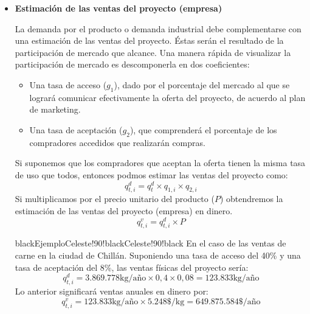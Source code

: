 \documentclass{templateNote}
\newcommand{\newparagraph}{\par\vspace{\baselineskip}\noindent}
\begin{document}
\begin{itemize}
  \item \textbf{Estimación de las ventas del proyecto (empresa)}
  \newparagraph
  La demanda por el producto o demanda industrial debe complementarse con una estimación de las ventas del proyecto. Éstas serán el resultado de la participación de mercado que alcance. Una manera rápida de visualizar la participación de mercado es descomponerla en dos coeficientes:
  \begin{itemize}
    \item Una tasa de acceso ($g_1$), dado por el porcentaje del mercado al que se logrará comunicar efectivamente la oferta del proyecto, de acuerdo al plan de marketing.
    \item Una tasa de aceptación ($g_2$), que comprenderá el porcentaje de los compradores accedidos que realizarán compras.
  \end{itemize}
  Si suponemos que los compradores que aceptan la oferta tienen la misma tasa de uso que todos, entonces podmos estimar las ventas del proyecto como:
  \begin{equation*}
    q_{t,i}^d = q_t^d \times q_{1,i} \times q_{2,i}
  \end{equation*}
  Si multiplicamos por el precio unitario del producto ($P$) obtendremos la estimación de las ventas del proyecto (empresa) en dinero.
  \begin{equation*}
    q_{t,i}^v = q_{t,i}^d \times P
  \end{equation*}
  \begin{CuadroPersonalizado}{black}{Ejemplo}{Celeste!90!black}{Celeste!90!black}
    En el caso de las ventas de carne en la ciudad de Chillán. Suponiendo una tasa de acceso del 40\% y una tasa de aceptación del 8\%, las ventas físicas del proyecto sería:
    \begin{equation*}
      q_{t,i}^d = 3.869.778 \text{kg/año} \times 0,4 \times 0,08 = 123.833 \text{kg/año}
    \end{equation*}
    Lo anterior significará ventas anuales en dinero por:
    \begin{equation*}
      q_{t,i}^v = 123.833 \text{kg/año} \times 5.248 \text{\$/kg} = 649.875.584 \text{\$/año}
    \end{equation*}
  \end{CuadroPersonalizado}
\end{itemize}
\end{document}
